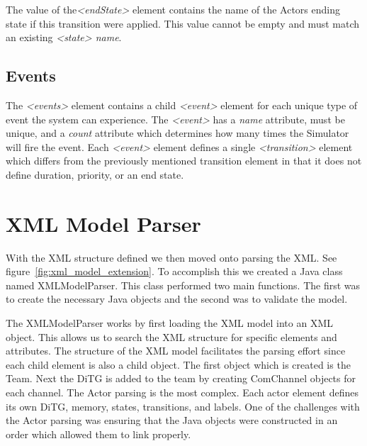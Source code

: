 The value of the{\em \textless endState\textgreater} element contains the name of the Actors ending state if this transition were applied.  This value cannot be empty and must match an existing {\em \textless state> name}.

\begin{spacing}{.5}

\end{spacing}


\subsection{Events}

The {\em \textless events\textgreater} element contains a child {\em \textless event\textgreater} element for each unique type of event the system can experience.  The {\em \textless event\textgreater} has a {\em name} attribute, must be unique, and a {\em count} attribute which determines how many times the Simulator will fire the event.  Each {\em \textless event\textgreater} element defines a single {\em \textless transition\textgreater} element which differs from the previously mentioned transition element in that it does not define duration, priority, or an end state.

\begin{spacing}{.5}

\end{spacing}

\section{XML Model Parser}

With the XML structure defined we then moved onto parsing the XML.  See figure~\ref{fig:xml_model_extension}.  To accomplish this we created a Java class named XMLModelParser.  This class performed two main functions.  The first was to create the necessary Java objects and the second was to validate the model.  

The XMLModelParser works by first loading the XML model into an XML object.  This allows us to search the XML structure for specific elements and attributes.  The structure of the XML model facilitates the parsing effort since each child element is also a child object.  The first object which is created is the Team.  Next the DiTG is added to the team by creating ComChannel objects for each channel.  The Actor parsing is the most complex.  Each actor element defines its own DiTG, memory, states, transitions, and labels.  One of the challenges with the Actor parsing was ensuring that the Java objects were constructed in an order which allowed them to link properly.

